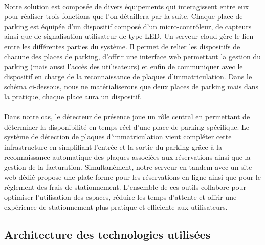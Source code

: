 \paragraph*{}
Notre solution est composée de divers équipements qui interagissent entre eux pour réaliser trois fonctions que l'on détaillera par la suite. Chaque place de parking est équipée d'un dispositif composé d'un micro-contrôleur, de capteurs ainsi que de signalisation utilisateur de type LED. Un serveur cloud gère le lien entre les différentes parties du système. Il permet de relier les dispositifs de chacune des places de parking, d'offrir une interface web permettant la gestion du parking (mais aussi l'accès des utilisateurs) et enfin de communiquer avec le dispositif en charge de la reconnaissance de plaques d'immatriculation. Dans le schéma ci-dessous, nous ne matérialiserons que deux places de parking mais dans la pratique, chaque place aura un dispositif.


\paragraph*{}
Dans notre cas, le détecteur de présence joue un rôle central en permettant de déterminer la disponibilité en temps réel d'une place de parking spécifique.
Le système de détection de plaques d'immatriculation vient compléter cette infrastructure en simplifiant l'entrée et la sortie du parking grâce à la reconnaissance automatique des plaques associées aux réservations ainsi que la gestion de la facturation. 
Simultanément, notre serveur en tandem avec un site web dédié propose une plate-forme pour les réservations en ligne ainsi que pour le règlement des frais de stationnement. 
L'ensemble de ces outils collabore pour optimiser l'utilisation des espaces, réduire les temps d'attente et offrir une expérience de stationnement plus pratique et efficiente aux utilisateurs.

\clearpage

\subsection*{Architecture des technologies utilisées}

